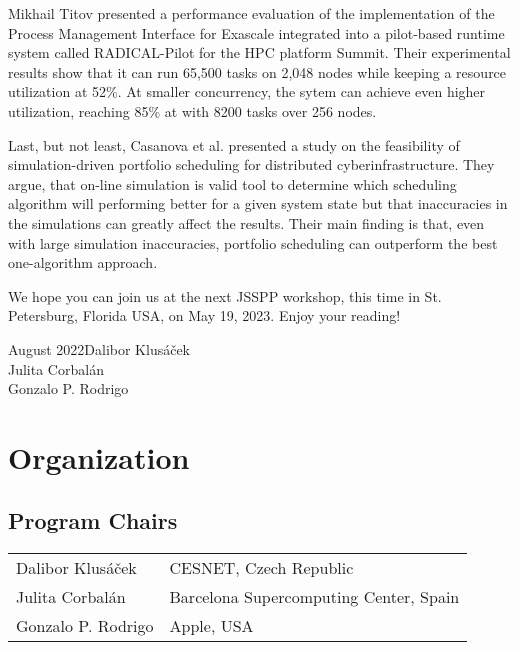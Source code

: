 \documentclass{llncs}
\begin{document}
Mikhail Titov presented a performance evaluation of the implementation of the Process Management
Interface for Exascale integrated into a pilot-based runtime system called RADICAL-Pilot for
the HPC platform Summit. Their experimental results show that it can run 65,500 tasks on
2,048 nodes while keeping a resource utilization at 52\%. At smaller concurrency, the sytem
can achieve even higher utilization, reaching 85\% at with 8200 tasks over 256 nodes.

Last, but not least, Casanova et al. presented a study on the feasibility of simulation-driven
portfolio scheduling for distributed cyberinfrastructure. They argue, that on-line simulation 
is valid tool to determine which scheduling algorithm will performing better for a given
system state but that inaccuracies in the simulations can greatly affect the results. Their
main finding is that, even with large simulation inaccuracies, portfolio scheduling can
outperform the best one-algorithm approach.




We hope you can join us at the next JSSPP workshop, this time in St. Petersburg, Florida USA, on May 19, 2023. Enjoy your reading!

\vspace{1cm}
\begin{flushright}\noindent
August 2022\hfill Dalibor Klus\'{a}\v{c}ek\\
Julita Corbal\'{a}n\\
Gonzalo P. Rodrigo\\
\end{flushright}
%
\chapter*{Organization}
%
\section*{Program Chairs}
\begin{tabular}{@{}p{5cm}@{}p{7.2cm}@{}}
Dalibor Klus\'{a}\v{c}ek &CESNET, Czech Republic\\
Julita Corbal\'{a}n &Barcelona Supercomputing Center, Spain\\
Gonzalo P. Rodrigo &Apple, USA\\
\end{tabular}
%
\end{document}
